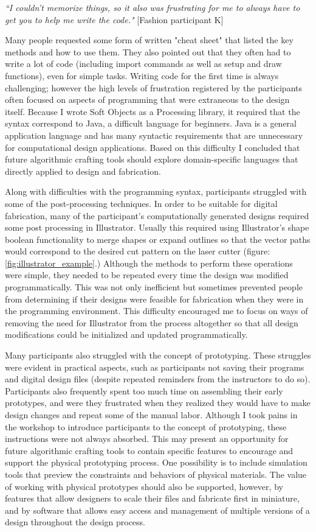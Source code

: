\textit{``I couldn't memorize things, so it also was frustrating for me to always have to get you to help me write the code."} [Fashion participant K]

Many people requested some form of written "cheat sheet" that listed the key methods and how to use them. They also pointed out that they often had to write a lot of code (including import commands as well as setup and draw functions), even for simple tasks. Writing code for the first time is always challenging; however the high levels of frustration registered by the participants often focused on aspects of programming that were extraneous to the design itself. Because I wrote Soft Objects as a Processing library, it required that the syntax correspond to Java, a difficult language for beginners. Java is a general application language and has many syntactic requirements that are unnecessary for computational design applications. Based on this difficulty I concluded that future algorithmic crafting tools should explore domain-specific languages that directly applied to design and fabrication.
 
Along with difficulties with the programming syntax, participants struggled with some of the post-processing techniques. In order to be suitable for digital fabrication, many of the participant's computationally generated designs required some post processing in Illustrator. Usually this required using Illustrator's shape boolean functionality to merge shapes or expand outlines so that the vector paths would correspond to the desired cut pattern on the laser cutter (figure:\ref{fig:illustrator_example}.) Although the methods to perform these operations were simple, they needed to be repeated every time the design was modified programmatically. This was not only inefficient but sometimes prevented people from determining if their designs were feasible for fabrication when they were in the programming environment. This difficulty encouraged me to focus on ways of removing the need for Illustrator from the process altogether so that all design modifications could be initialized and updated programmatically.

Many participants  also struggled with the concept of prototyping. These struggles were evident in practical aspects, such as participants not saving their programs and digital design files (despite repeated reminders from the instructors to do so). Participants also frequently spent too much time on assembling their early prototypes, and were they frustrated when they realized they would have to make design changes and repeat some of the manual labor. Although I took pains in the workshop to introduce participants to the concept of prototyping, these instructions were not always absorbed. This may present an opportunity for future algorithmic crafting tools to contain specific features to encourage and support the physical prototyping process. One possibility is to include simulation tools that preview the constraints and behaviors of physical materials. The value of working with physical prototypes should also be supported, however, by features that allow designers to scale their files and fabricate first in miniature, and by software that allows easy access and management of multiple versions of a design throughout the design process.
	
